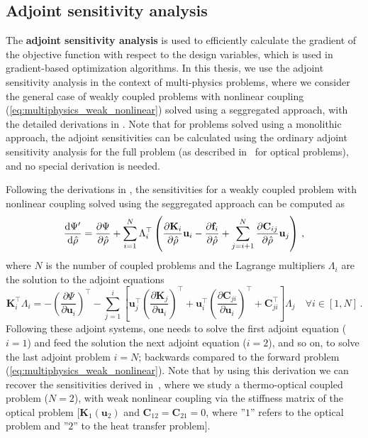     \subsection*{Adjoint sensitivity analysis}

    The \textbf{adjoint sensitivity analysis} is used to efficiently calculate the gradient
    of the objective function with
    respect to the design variables, which is used in gradient-based optimization algorithms. 
    In this thesis, we use the adjoint sensitivity
    analysis  in the context of
    multi-physics problems, where we consider the general case of weakly coupled problems with
    nonlinear coupling (\eqref{eq:multiphysics_weak_nonlinear}) solved using a seggregated approach, with the detailed derivations in 
    . Note that for problems 
    solved using a monolithic approach, the adjoint sensitivities can be calculated using the
    ordinary adjoint sensitivity analysis for the full problem (as described in~\cite{jensen_review} for optical problems), and no special derivation is needed.

    Following the derivations in , the sensitivities for a weakly coupled problem with nonlinear coupling solved using the seggregated
    approach can be computed as
    \begin{equation}
        \frac{\mathop{}\!\text{d} \Psi^\prime}{\mathop{}\!\text{d} \hat{\rho}}  = \frac{\partial \Psi}{\partial \hat{\rho}} + \sum^N_{i=1} \Lambda_{i}^{\top} \left( \frac{\partial \mathbf{K}_i}{\partial \hat{\rho}} \mathbf{u}_i - \frac{\partial \mathbf{f}_i}{\partial \hat{\rho}} + \sum^N_{j=i+1} \frac{\partial \mathbf{C}_{ij}}{\partial \hat{\rho}} \mathbf{u}_j \right)\,,
    \end{equation}
    where $N$ is the number of coupled problems and the Lagrange multipliers $\Lambda_i$ are the solution to the adjoint equations
    \begin{equation}
        \mathbf{K}^\top_i \Lambda_i = -\left(\frac{\partial \Psi}{\partial \mathbf{u}_i}\right)^\top - \sum_{j=1}^{i} \left[ 
        \mathbf{u}^\top_j \left(\frac{\partial \mathbf{K}_j}{\partial \mathbf{u}_i}\right)^\top  + \mathbf{u}^\top_i \left(\frac{\partial \mathbf{C}_{ji}}{\partial \mathbf{u}_i}\right)^\top + \mathbf{C}^\top_{ji} \right]\Lambda_j  \quad \forall i \in [1, N] \,.
   \end{equation}
    Following these adjoint systems, one needs to solve the first adjoint equation ($i=1$) 
    and feed the solution the next adjoint equation ($i=2$), and so on, to solve the last adjoint problem $i=N$; backwards compared to the forward problem (\eqref{eq:multiphysics_weak_nonlinear}).
    Note that by using this derivation we can recover the sensitivities derived in~\cite{ownpub0}, where we study a thermo-optical coupled problem ($N=2$), with weak nonlinear coupling
    via the stiffness matrix of the optical problem [$\mathbf{K}_1(\mathbf{u}_2)$ and $\mathbf{C}_{12}=\mathbf{C}_{21}=0$, where ''$1$'' refers to the optical problem and ''$2$'' to the 
    heat transfer problem].
    
